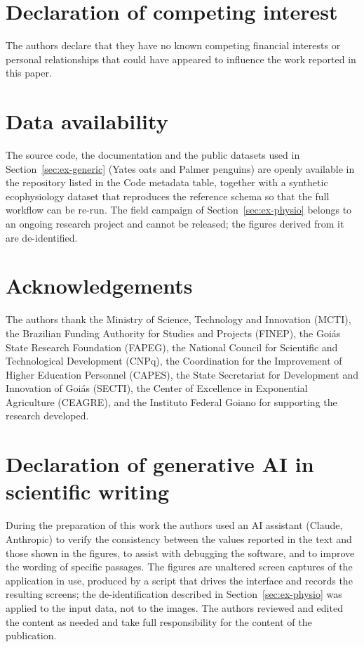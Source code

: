 \documentclass[11pt, letterpaper]{article}
\begin{document}
\section*{Declaration of competing interest}
The authors declare that they have no known competing financial interests or personal relationships that could have appeared to influence the work reported in this paper.

\section*{Data availability}
The source code, the documentation and the public datasets used in Section~\ref{sec:ex-generic} (Yates oats and Palmer penguins) are openly available in the repository listed in the Code metadata table, together with a synthetic ecophysiology dataset that reproduces the reference schema so that the full workflow can be re-run. The field campaign of Section~\ref{sec:ex-physio} belongs to an ongoing research project and cannot be released; the figures derived from it are de-identified.

\section*{Acknowledgements}

The authors thank the Ministry of Science, Technology and Innovation (MCTI), the Brazilian Funding Authority for Studies and Projects (FINEP), the Goi\'as State Research Foundation (FAPEG), the National Council for Scientific and Technological Development (CNPq), the Coordination for the Improvement of Higher Education Personnel (CAPES), the State Secretariat for Development and Innovation of Goi\'as (SECTI), the Center of Excellence in Exponential Agriculture (CEAGRE), and the Instituto Federal Goiano for supporting the research developed.

\section*{Declaration of generative AI in scientific writing}

During the preparation of this work the authors used an AI assistant (Claude, Anthropic) to verify the consistency between the values reported in the text and those shown in the figures, to assist with debugging the software, and to improve the wording of specific passages. The figures are unaltered screen captures of the application in use, produced by a script that drives the interface and records the resulting screens; the de-identification described in Section~\ref{sec:ex-physio} was applied to the input data, not to the images. The authors reviewed and edited the content as needed and take full responsibility for the content of the publication.



\end{document}
